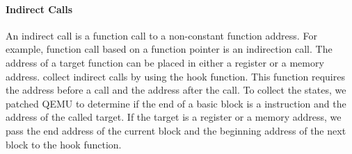 %
%

\paragraph{Indirect Calls} An indirect call is a function call to a non-constant function address. For example, function call based on a function pointer is an indirection call. The address of a target function can be placed in either a register or a memory address. \libfuzzer collect indirect calls by using the  hook function. This function requires the address before a call and the address after the call. To collect the states, we patched QEMU to determine if the end of a basic block is a  instruction and the address of the called target. If the target is a register or a memory address, we pass the end address of the current block and the beginning address of the next block to the hook function.

%
%

